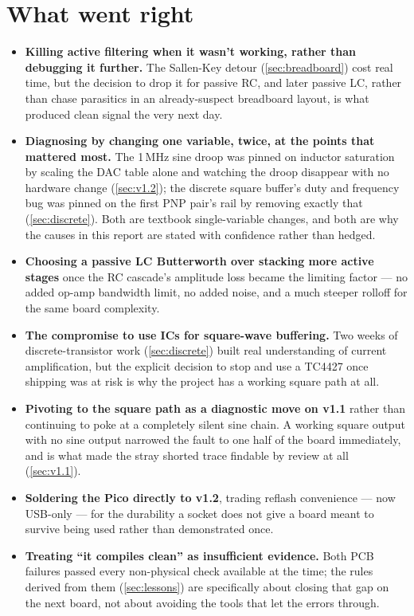 \documentclass[11pt,a4paper]{article}
\begin{document}
\section{What went right}
\label{sec:right}

\begin{itemize}
    \item \textbf{Killing active filtering when it wasn't working, rather than debugging it
              further.} The Sallen-Key detour (\cref{sec:breadboard}) cost real time, but the decision
          to drop it for passive RC, and later passive LC, rather than chase parasitics in an
          already-suspect breadboard layout, is what produced clean signal the very next day.
    \item \textbf{Diagnosing by changing one variable, twice, at the points that mattered
              most.} The 1\,MHz sine droop was pinned on inductor saturation by scaling the DAC table
          alone and watching the droop disappear with no hardware change (\cref{sec:v1.2}); the
          discrete square buffer's duty and frequency bug was pinned on the first PNP pair's rail by
          removing exactly that (\cref{sec:discrete}). Both are textbook single-variable changes,
          and both are why the causes in this report are stated with confidence rather than hedged.
    \item \textbf{Choosing a passive LC Butterworth over stacking more active stages} once
          the RC cascade's amplitude loss became the limiting factor --- no added op-amp bandwidth
          limit, no added noise, and a much steeper rolloff for the same board complexity.
    \item \textbf{The compromise to use ICs for square-wave buffering.} Two weeks of
          discrete-transistor work (\cref{sec:discrete}) built real understanding of current
          amplification, but the explicit decision to stop and use a TC4427 once shipping was at
          risk is why the project has a working square path at all.
    \item \textbf{Pivoting to the square path as a diagnostic move on v1.1} rather than
          continuing to poke at a completely silent sine chain. A working square output with no
          sine output narrowed the fault to one half of the board immediately, and is what made the
          stray shorted trace findable by review at all (\cref{sec:v1.1}).
    \item \textbf{Soldering the Pico directly to v1.2}, trading reflash convenience --- now
          USB-only --- for the durability a socket does not give a board meant to survive being
          used rather than demonstrated once.
    \item \textbf{Treating ``it compiles clean'' as insufficient evidence.} Both PCB failures
          passed every non-physical check available at the time; the rules derived from them
          (\cref{sec:lessons}) are specifically about closing that gap on the next board, not about
          avoiding the tools that let the errors through.
\end{itemize}
\end{document}
